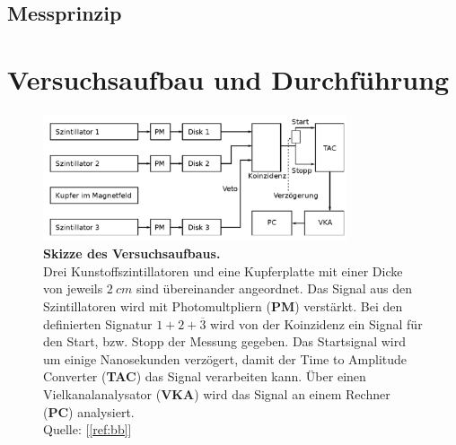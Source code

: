\documentclass[a4paper,ngerman]{scrartcl}
\begin{document}
\subsection{Messprinzip}
\label{sec:messprinzip}
\clearpage

\section{Versuchsaufbau und Durchführung}


\begin{figure}[tb!]
  \centering
  \includegraphics[width=0.8\textwidth]{abbildungen/aufbau_skizze.png}
  \caption{\textbf{Skizze des Versuchsaufbaus.} 
  \\ 
  Drei Kunstoffszintillatoren und eine Kupferplatte mit einer Dicke von jeweils $\SI{2}{cm}$ sind übereinander angeordnet. 	Das Signal aus den Szintillatoren wird mit Photomultpliern (\textbf{PM}) verstärkt. Bei den definierten Signatur $1 + 2 + \overline{3}$ wird von der Koinzidenz ein Signal für den Start, bzw. Stopp der Messung gegeben. Das Startsignal wird um einige Nanosekunden verzögert, damit der Time to Amplitude Converter (\textbf{TAC}) das Signal verarbeiten kann. Über einen Vielkanalanalysator (\textbf{VKA}) wird das Signal an einem Rechner (\textbf{PC}) analysiert.
  \\Quelle: [\ref{ref:bb}]}
  \label{fig:blmaufbau}
\end{figure}
\end{document}
